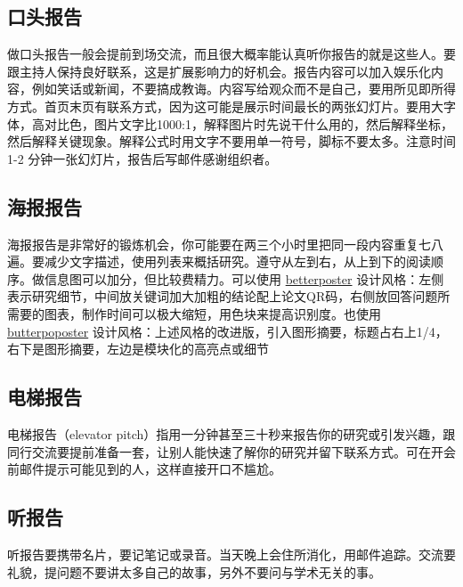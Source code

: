 \documentclass[]{tufte-book}
\begin{document}
\hypertarget{ux53e3ux5934ux62a5ux544a}{%
\subsection{口头报告}\label{ux53e3ux5934ux62a5ux544a}}

做口头报告一般会提前到场交流，而且很大概率能认真听你报告的就是这些人。要跟主持人保持良好联系，这是扩展影响力的好机会。报告内容可以加入娱乐化内容，例如笑话或新闻，不要搞成教诲。内容写给观众而不是自己，要用所见即所得方式。首页末页有联系方式，因为这可能是展示时间最长的两张幻灯片。要用大字体，高对比色，图片文字比1000:1，解释图片时先说干什么用的，然后解释坐标，然后解释关键现象。解释公式时用文字不要用单一符号，脚标不要太多。注意时间 1-2 分钟一张幻灯片，报告后写邮件感谢组织者。

\hypertarget{ux6d77ux62a5ux62a5ux544a}{%
\subsection{海报报告}\label{ux6d77ux62a5ux62a5ux544a}}

海报报告是非常好的锻炼机会，你可能要在两三个小时里把同一段内容重复七八遍。要减少文字描述，使用列表来概括研究。遵守从左到右，从上到下的阅读顺序。做信息图可以加分，但比较费精力。可以使用 \href{https://www.insidehighered.com/news/2019/06/24/theres-movement-better-scientific-posters-are-they-really-better}{betterposter} 设计风格：左侧表示研究细节，中间放关键词加大加粗的结论配上论文QR码，右侧放回答问题所需要的图表，制作时间可以极大缩短，用色块来提高识别度。也使用 \href{https://derekcrowe.net/butterposter}{butterpoposter} 设计风格：上述风格的改进版，引入图形摘要，标题占右上1/4，右下是图形摘要，左边是模块化的高亮点或细节

\hypertarget{ux7535ux68afux62a5ux544a}{%
\subsection{电梯报告}\label{ux7535ux68afux62a5ux544a}}

电梯报告（elevator pitch）指用一分钟甚至三十秒来报告你的研究或引发兴趣，跟同行交流要提前准备一套，让别人能快速了解你的研究并留下联系方式。可在开会前邮件提示可能见到的人，这样直接开口不尴尬。

\hypertarget{ux542cux62a5ux544a}{%
\subsection{听报告}\label{ux542cux62a5ux544a}}

听报告要携带名片，要记笔记或录音。当天晚上会住所消化，用邮件追踪。交流要礼貌，提问题不要讲太多自己的故事，另外不要问与学术无关的事。
\end{document}
